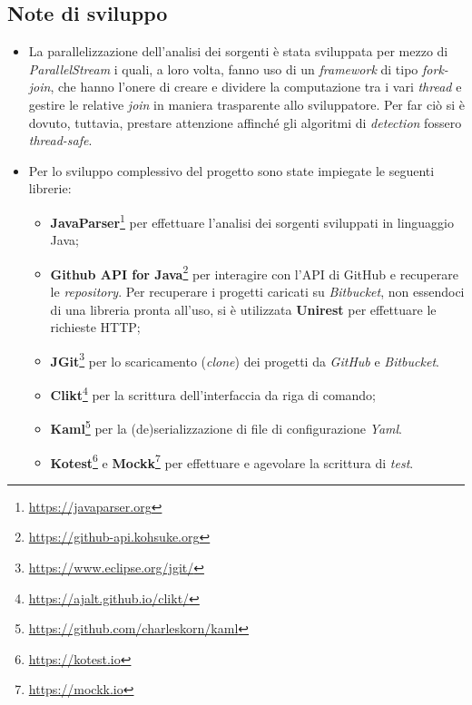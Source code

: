 \subsection*{Note di sviluppo}
\begin{itemize}
	\item La parallelizzazione dell'analisi dei sorgenti è stata sviluppata per mezzo di \textit{ParallelStream} i quali, a loro volta, fanno uso di un \textit{framework} di tipo \textit{fork-join}, che hanno l'onere di creare e dividere la computazione tra i vari \textit{thread} e gestire le relative \textit{join} in maniera trasparente allo sviluppatore. Per far ciò si è dovuto, tuttavia, prestare attenzione affinché gli algoritmi di \textit{detection} fossero \textit{thread-safe}.
	\item Per lo sviluppo complessivo del progetto sono state impiegate le seguenti librerie:
	\begin{itemize}
		\item \textbf{JavaParser}\footnote{\url{https://javaparser.org}} per effettuare l'analisi dei sorgenti sviluppati in linguaggio Java;
		\item \textbf{Github API for Java}\footnote{\url{https://github-api.kohsuke.org}} per interagire con l'API di GitHub e recuperare le \textit{repository}. Per recuperare i progetti caricati su \textit{Bitbucket}, non essendoci di una libreria pronta all'uso, si è utilizzata \textbf{Unirest} per effettuare le richieste HTTP;
		\item \textbf{JGit}\footnote{\url{https://www.eclipse.org/jgit/}} per lo scaricamento (\textit{clone}) dei progetti da \textit{GitHub} e \textit{Bitbucket}.
		\item \textbf{Clikt}\footnote{\url{https://ajalt.github.io/clikt/}} per la scrittura dell'interfaccia da riga di comando;
		\item \textbf{Kaml}\footnote{\url{https://github.com/charleskorn/kaml}} per la (de)serializzazione di file di configurazione \textit{Yaml}.
		\item \textbf{Kotest}\footnote{\url{https://kotest.io}} e \textbf{Mockk}\footnote{\url{https://mockk.io}} per effettuare e agevolare la scrittura di \textit{test}.
	\end{itemize}
\end{itemize}
